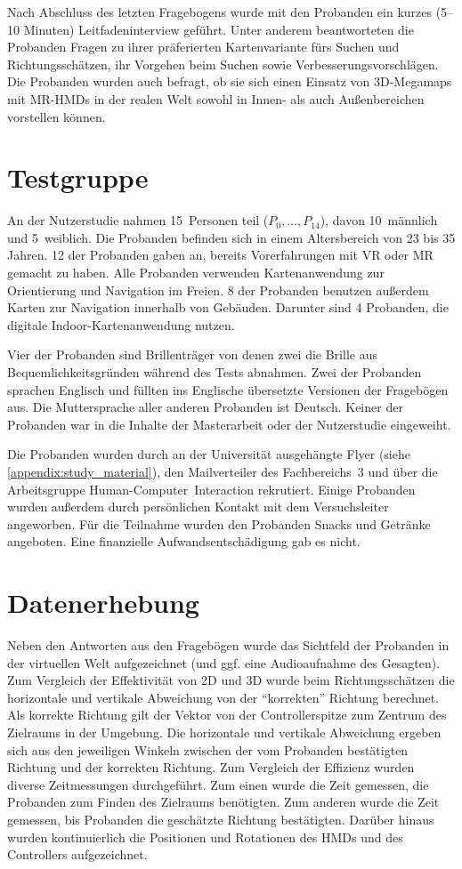 Nach Abschluss des letzten Fragebogens wurde mit den Probanden ein kurzes (5--10 Minuten) Leitfadeninterview geführt.
Unter anderem beantworteten die Probanden Fragen zu ihrer präferierten Kartenvariante fürs Suchen und Richtungsschätzen, ihr Vorgehen beim Suchen sowie Verbesserungsvorschlägen.
Die Probanden wurden auch befragt, ob sie sich einen Einsatz von 3D-Megamaps mit MR-HMDs in der realen Welt sowohl in Innen- als auch Außenbereichen vorstellen können.

\section{Testgruppe}
An der Nutzerstudie nahmen 15~Personen teil ($P_0, \dots, P_{14}$), davon 10~männlich und 5~weiblich.
Die Probanden befinden sich in einem Altersbereich von 23 bis 35 Jahren.
12 der Probanden gaben an, bereits Vorerfahrungen mit VR oder MR gemacht zu haben.
Alle Probanden verwenden Kartenanwendung zur Orientierung und Navigation im Freien.
8 der Probanden benutzen außerdem Karten zur Navigation innerhalb von Gebäuden.
Darunter sind 4 Probanden, die digitale Indoor-Kartenanwendung nutzen.

Vier der Probanden sind Brillenträger von denen zwei die Brille aus Bequemlichkeitsgründen während des Tests abnahmen.
Zwei der Probanden sprachen Englisch und füllten ins Englische übersetzte Versionen der Fragebögen aus.
Die Muttersprache aller anderen Probanden ist Deutsch.
Keiner der Probanden war in die Inhalte der Masterarbeit oder der Nutzerstudie eingeweiht.

Die Probanden wurden durch an der Universität ausgehängte Flyer (siehe \autoref{appendix:study_material}), den Mailverteiler des Fachbereichs~3 und über die Arbeitsgruppe Human-Computer~Interaction rekrutiert.
Einige Probanden wurden außerdem durch persönlichen Kontakt mit dem Versuchsleiter angeworben.
Für die Teilnahme wurden den Probanden Snacks und Getränke angeboten.
Eine finanzielle Aufwandsentschädigung gab es nicht.

\section{Datenerhebung}
Neben den Antworten aus den Fragebögen wurde das Sichtfeld der Probanden in der virtuellen Welt aufgezeichnet (und ggf. eine Audioaufnahme des Gesagten).
Zum Vergleich der Effektivität von 2D und 3D wurde beim Richtungsschätzen die horizontale und vertikale Abweichung von der \enquote{korrekten} Richtung berechnet.
Als korrekte Richtung gilt der Vektor von der Controllerspitze zum Zentrum des Zielraums in der Umgebung.
Die horizontale und vertikale Abweichung ergeben sich aus den jeweiligen Winkeln zwischen der vom Probanden bestätigten Richtung und der korrekten Richtung.
Zum Vergleich der Effizienz wurden diverse Zeitmessungen durchgeführt.
Zum einen wurde die Zeit gemessen, die Probanden zum Finden des Zielraums benötigten.
Zum anderen wurde die Zeit gemessen, bis Probanden die geschätzte Richtung bestätigten.
Darüber hinaus wurden kontinuierlich die Positionen und Rotationen des HMDs und des Controllers aufgezeichnet.

